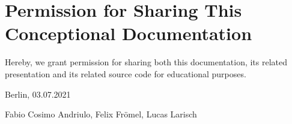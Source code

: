 \section*{Permission for Sharing This Conceptional Documentation}

Hereby, we grant permission for sharing both this documentation, its related presentation and its related source code for educational purposes.

\vspace{15mm}

{\setlength{\parindent}{0cm}
Berlin, 03.07.2021

Fabio Cosimo Andriulo,
    Felix Frömel,
    Lucas Larisch
}
